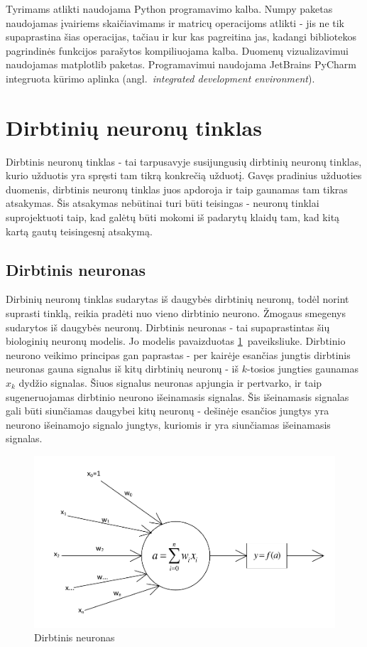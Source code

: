 \documentclass{VUMIFPSbakalaurinis}
\begin{document}
Tyrimams atlikti naudojama Python programavimo kalba.
Numpy paketas naudojamas įvairiems skaičiavimams ir matricų operacijoms atlikti - jis ne tik supaprastina šias operacijas, tačiau ir kur kas pagreitina jas, kadangi bibliotekos pagrindinės funkcijos parašytos kompiliuojama kalba.
Duomenų vizualizavimui naudojamas matplotlib paketas.
Programavimui naudojama JetBrains PyCharm integruota kūrimo aplinka (angl.~\textit{integrated development environment}).



\section{Dirbtinių neuronų tinklas}

Dirbtinis neuronų tinklas - tai tarpusavyje susijungusių dirbtinių neuronų tinklas, kurio užduotis yra spręsti tam tikrą konkrečią užduotį.
Gavęs pradinius užduoties duomenis, dirbtinis neuronų tinklas juos apdoroja ir taip gaunamas tam tikras atsakymas.
Šis atsakymas nebūtinai turi būti teisingas - neuronų tinklai suprojektuoti taip, kad galėtų būti mokomi iš padarytų klaidų tam, kad kitą kartą gautų teisingesnį atsakymą.

\subsection{Dirbtinis neuronas}

Dirbinių neuronų tinklas sudarytas iš daugybės dirbtinių neuronų, todėl norint suprasti tinklą, reikia pradėti nuo vieno dirbtinio neurono.
Žmogaus smegenys sudarytos iš daugybės neuronų.
Dirbtinis neuronas - tai supaprastintas šių biologinių neuronų modelis.
Jo modelis pavaizduotas \ref{fig:neuron}~paveiksliuke.
Dirbtinio neurono veikimo principas gan paprastas - per kairėje esančias jungtis dirbtinis neuronas gauna signalus iš kitų dirbtinių neuronų - iš $k$-tosios jungties gaunamas $x_k$ dydžio signalas.
Šiuos signalus neuronas apjungia ir pertvarko, ir taip sugeneruojamas dirbtinio neurono išeinamasis signalas.
Šis išeinamasis signalas gali būti siunčiamas daugybei kitų neuronų - dešinėje esančios jungtys yra neurono išeinamojo signalo jungtys, kuriomis ir yra siunčiamas išeinamasis signalas.

\begin{figure}
	\includegraphics[scale=0.75]{diagrams/1_neuron}
	\caption{Dirbtinis neuronas}
	\label{fig:neuron}
\end{figure}
\end{document}
